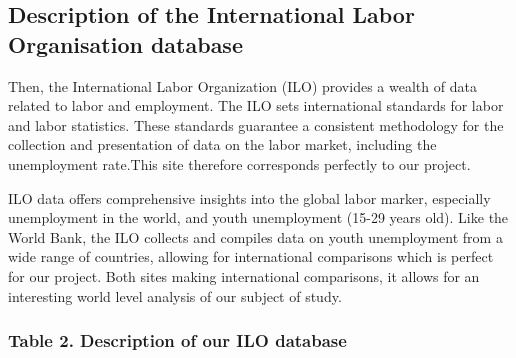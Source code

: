 \documentclass[
  letterpaper,
  DIV=11,
  numbers=noendperiod]{scrartcl}
\begin{document}
\hypertarget{description-of-the-international-labor-organisation-database}{%
\subsection{Description of the International Labor Organisation
database}\label{description-of-the-international-labor-organisation-database}}

Then, the International Labor Organization (ILO) provides a wealth of
data related to labor and employment. The ILO sets international
standards for labor and labor statistics. These standards guarantee a
consistent methodology for the collection and presentation of data on
the labor market, including the unemployment rate.This site therefore
corresponds perfectly to our project.

ILO data offers comprehensive insights into the global labor marker,
especially unemployment in the world, and youth unemployment (15-29
years old). Like the World Bank, the ILO collects and compiles data on
youth unemployment from a wide range of countries, allowing for
international comparisons which is perfect for our project. Both sites
making international comparisons, it allows for an interesting world
level analysis of our subject of study.

\hypertarget{table-2.-description-of-our-ilo-database}{%
\subsubsection{Table 2. Description of our ILO
database}\label{table-2.-description-of-our-ilo-database}}
\end{document}
